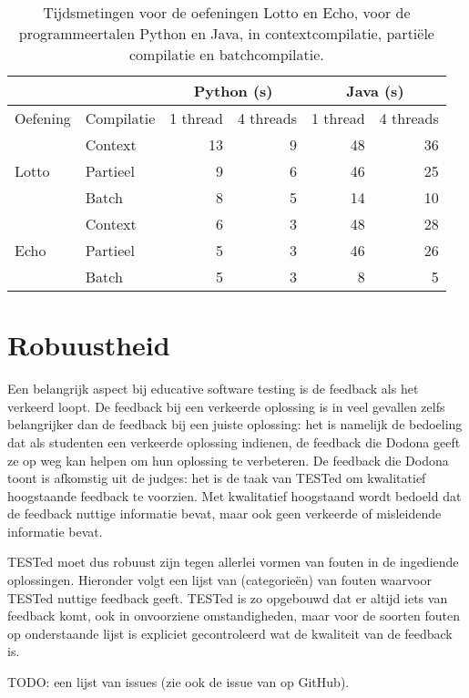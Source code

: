 \begin{table}
    \centering
    \begin{tabular}{ll|r|r|r|r|}
        \cline{3-6}
        & & \multicolumn{2}{c|}{Python (s)} & \multicolumn{2}{c|}{Java (s)}  \\
        \hline
        \multicolumn{1}{|l|}{Oefening}               & Compilatie & 1 thread & 4 threads & 1 thread & 4 threads \\
        \hline
        \multicolumn{1}{|l|}{\multirow{3}{*}{Lotto}} & Context    & 13       & 9         & 48       & 36        \\
        \multicolumn{1}{|l|}{}                       & Partieel   & 9        & 6         & 46       & 25        \\
        \multicolumn{1}{|l|}{}                       & Batch      & 8        & 5         & 14       & 10        \\
        \hline
        \multicolumn{1}{|l|}{\multirow{3}{*}{Echo}}  & Context    & 6        & 3         & 48       & 28        \\
        \multicolumn{1}{|l|}{}                       & Partieel   & 5        & 3         & 46       & 26        \\
        \multicolumn{1}{|l|}{}                       & Batch      & 5        & 3         & 8        & 5         \\
        \hline
    \end{tabular}
    \caption{Tijdsmetingen voor de oefeningen Lotto en Echo, voor de programmeertalen Python en Java, in contextcompilatie, partiële compilatie en batchcompilatie.}
    \label{tab:meting}
\end{table}

\section{Robuustheid}\label{sec:robuustheid}

Een belangrijk aspect bij educative software testing is de feedback als het verkeerd loopt.
De feedback bij een verkeerde oplossing is in veel gevallen zelfs belangrijker dan de feedback bij een juiste oplossing: het is namelijk de bedoeling dat als studenten een verkeerde oplossing indienen, de feedback die Dodona geeft ze op weg kan helpen om hun oplossing te verbeteren.
De feedback die Dodona toont is afkomstig uit de judges: het is de taak van TESTed om kwalitatief hoogstaande feedback te voorzien.
Met kwalitatief hoogstaand wordt bedoeld dat de feedback nuttige informatie bevat, maar ook geen verkeerde of misleidende informatie bevat.

TESTed moet dus robuust zijn tegen allerlei vormen van fouten in de ingediende oplossingen.
Hieronder volgt een lijst van (categorieën) van fouten waarvoor TESTed nuttige feedback geeft.
TESTed is zo opgebouwd dat er altijd iets van feedback komt, ook in onvoorziene omstandigheden, maar voor de soorten fouten op onderstaande lijst is expliciet gecontroleerd wat de kwaliteit van de feedback is.

TODO: een lijst van issues (zie ook de issue van op GitHub).

